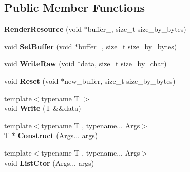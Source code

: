 \subsection*{Public Member Functions}
\begin{DoxyCompactItemize}
\item 
\mbox{\label{structnabla_1_1renderer_1_1_render_resource_a2b44e394e21cc1137d53473fd9ec9b5a}} 
{\bfseries Render\+Resource} (void $\ast$buffer\+\_\+, size\+\_\+t size\+\_\+by\+\_\+bytes)
\item 
\mbox{\label{structnabla_1_1renderer_1_1_render_resource_a3c3e8175471df971d9d4f59c5dffd497}} 
void {\bfseries Set\+Buffer} (void $\ast$buffer\+\_\+, size\+\_\+t size\+\_\+by\+\_\+bytes)
\item 
\mbox{\label{structnabla_1_1renderer_1_1_render_resource_ae12fa2d84dc4f4fc155389bd61d860a9}} 
void {\bfseries Write\+Raw} (void $\ast$data, size\+\_\+t size\+\_\+by\+\_\+char)
\item 
\mbox{\label{structnabla_1_1renderer_1_1_render_resource_abf11641c88ed79df4baf47b58a413114}} 
void {\bfseries Reset} (void $\ast$new\+\_\+buffer, size\+\_\+t size\+\_\+by\+\_\+bytes)
\item 
\mbox{\label{structnabla_1_1renderer_1_1_render_resource_aff470546a7c42223b3f4b05eb267b3c7}} 
{\footnotesize template$<$typename T $>$ }\\void {\bfseries Write} (T \&\&data)
\item 
\mbox{\label{structnabla_1_1renderer_1_1_render_resource_a5757b9bd5f4375120193451b22e9973e}} 
{\footnotesize template$<$typename T , typename... Args$>$ }\\T $\ast$ {\bfseries Construct} (Args... args)
\item 
\mbox{\label{structnabla_1_1renderer_1_1_render_resource_a845730d3edb4873c22416001613f3414}} 
{\footnotesize template$<$typename T , typename... Args$>$ }\\void {\bfseries List\+Ctor} (Args... args)

\end{DoxyCompactItemize}

